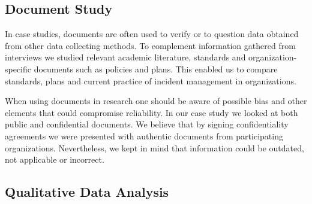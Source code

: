 

\subsection{Document Study}
\label{sec:documentStudy}
In case studies, documents are often used to verify or to question data obtained from other data collecting methods. To complement information gathered from interviews we studied relevant academic literature, standards and organization-specific documents such as policies and plans. This enabled us to compare standards, plans and current practice of incident management in organizations.

When using documents in research one should be aware of possible bias and other elements that could compromise reliability\cite{oates2005researching}. In our case study we looked at both public and confidential documents.  We believe that by signing confidentiality agreements we were presented with authentic documents from participating organizations. Nevertheless, we kept in mind that information could be outdated, not applicable or incorrect.      


\subsection{Qualitative Data Analysis}
\label{sec:qualitativeAnalysis}

